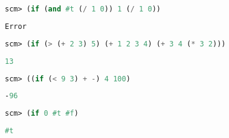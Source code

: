 \begin{lstlisting}[language=Scheme]
scm> (if (and #t (/ 1 0)) 1 (/ 1 0))
\end{lstlisting}
\begin{solution}[0.15in]
\begin{lstlisting}[language=Scheme]
Error
\end{lstlisting}
\end{solution}

\begin{lstlisting}[language=Scheme]
scm> (if (> (+ 2 3) 5) (+ 1 2 3 4) (+ 3 4 (* 3 2)))
\end{lstlisting}
\begin{solution}[0.15in]
\begin{lstlisting}[language=Scheme]
13
\end{lstlisting}
\end{solution}

\begin{lstlisting}[language=Scheme]
scm> ((if (< 9 3) + -) 4 100)
\end{lstlisting}
\begin{solution}[0.15in]
\begin{lstlisting}[language=Scheme]
-96
\end{lstlisting}
\end{solution}

\begin{lstlisting}[language=Scheme]
scm> (if 0 #t #f)
\end{lstlisting}
\begin{solution}[0.15in]
\begin{lstlisting}[language=Scheme]
#t
\end{lstlisting}
\end{solution}
